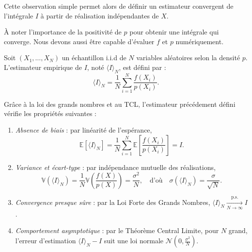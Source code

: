 Cette observation simple permet alors de définir un estimateur convergent de l'intégrale $I$ à partir de réalisation indépendantes de $X$. 

\begin{remark}
    À noter l'importance de la positivité de $p$ pour obtenir une intégrale qui converge. Nous devons aussi être capable d'évaluer $f$ et $p$ numériquement. 
\end{remark}

\begin{definition}
    Soit $(X_1, \dots, X_N)$ un échantillon i.i.d de $N$ variables aléatoires selon la densité $p$. L'estimateur empirique de $I$, noté $\langle I \rangle_N$, est défini par :
    \begin{equation}
        \langle I \rangle_N = \frac{1}{N} \sum_{i=1}^N \frac{f(X_i)}{p(X_i)}.
    \end{equation}
\end{definition}

\begin{prop}
    Grâce à la loi des grands nombres et au TCL, l'estimateur précédement défini vérifie les propriétés suivantes : 
    \begin{enumerate}
        \item \emph{Absence de biais} : par linéarité de l'espérance,
        \begin{equation}
            \mathbb{E}\left[ \langle I \rangle_N \right] = \frac{1}{N} \sum_{i=1}^N \mathbb{E}\left[ \frac{f(X_i)}{p(X_i)} \right] = I.
        \end{equation}
        \item \emph{Variance et écart-type} : par indépendance mutuelle des réalisations,
        \begin{equation}
            \mathbb{V}\left( \langle I \rangle_N \right) = \frac{1}{N} \mathbb{V}\left( \frac{f(X)}{p(X)} \right) = \frac{\sigma^2}{N}, \quad \text{d'où} \quad \sigma(\langle I \rangle_N) = \frac{\sigma}{\sqrt{N}}.
        \end{equation}
        \item \emph{Convergence presque sûre} : par la Loi Forte des Grands Nombres, $\langle I \rangle_N \xrightarrow[N \to \infty]{\text{p.s.}} I$.
        \item \emph{Comportement asymptotique} : par le Théorème Central Limite, pour $N$ grand, l'erreur d'estimation $\langle I \rangle_N - I$ suit une loi normale $\mathcal{N}\left(0, \frac{\sigma^2}{N}\right)$.
    \end{enumerate}
\end{prop}

